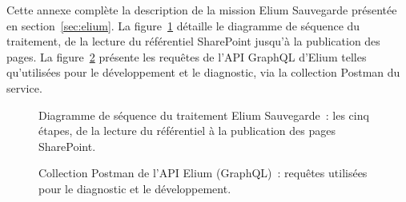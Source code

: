 Cette annexe complète la description de la mission Elium Sauvegarde présentée en
section~\ref{sec:elium}. La figure~\ref{fig:ann-elium-seq} détaille le
diagramme de séquence du traitement, de la lecture du référentiel SharePoint
jusqu'à la publication des pages. La figure~\ref{fig:ann-elium-postman}
présente les requêtes de l'API GraphQL d'Elium telles qu'utilisées pour le
développement et le diagnostic, via la collection Postman du service.

\begin{figure}[H]
  \centering
  \caption{Diagramme de séquence du traitement Elium Sauvegarde~: les cinq
    étapes, de la lecture du référentiel à la publication des pages SharePoint.}
  \label{fig:ann-elium-seq}
\end{figure}

\begin{figure}[H]
  \centering
  \caption{Collection Postman de l'API Elium (GraphQL)~: requêtes utilisées
    pour le diagnostic et le développement.}
  \label{fig:ann-elium-postman}
\end{figure}
